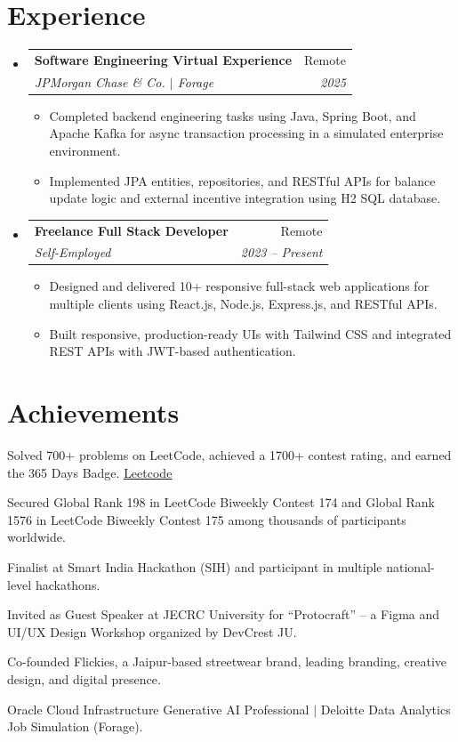 \documentclass[letterpaper,11pt]{article}
\makeatletter
\newcommand{\resumeItem}[1]{
  \item\small{
    {#1 \vspace{-2pt}}
  }
}
\newcommand{\resumeSubheading}[4]{
  \vspace{-2pt}\item
    \begin{tabular*}{0.97\textwidth}[t]{l@{\extracolsep{\fill}}r}
      \textbf{#1} & #2 \\
      \textit{\small#3} & \textit{\small #4} \\
    \end{tabular*}\vspace{-7pt}
}
\newcommand{\resumeSubHeadingListStart}{\begin{itemize}[leftmargin=0.15in, label={}]}
\newcommand{\resumeSubHeadingListEnd}{\end{itemize}}
\newcommand{\resumeItemListStart}{\begin{itemize}[label=$\vcenter{\hbox{\tiny$\bullet$}}$]}
\newcommand{\resumeItemListEnd}{\end{itemize}\vspace{-5pt}}
\makeatother
\begin{document}
\section{Experience}
\resumeSubHeadingListStart

\resumeSubheading
  {Software Engineering Virtual Experience}{Remote}
  {JPMorgan Chase \& Co. $|$ Forage}{2025}
  \resumeItemListStart
\resumeItem{Completed backend engineering tasks using Java, Spring Boot, and Apache Kafka for async transaction processing in a simulated enterprise environment.}
\resumeItem{Implemented JPA entities, repositories, and RESTful APIs for balance update logic and external incentive integration using H2 SQL database.}
  \resumeItemListEnd

\resumeSubheading
  {Freelance Full Stack Developer}{Remote}
  {Self-Employed}{2023 -- Present}
  \resumeItemListStart
    \resumeItem{Designed and delivered 10+ responsive full-stack web applications for multiple clients using React.js, Node.js, Express.js, and RESTful APIs.}
    \resumeItem{Built responsive, production-ready UIs with Tailwind CSS and integrated REST APIs with JWT-based authentication.}
  \resumeItemListEnd

\resumeSubHeadingListEnd


\section{Achievements}
\vspace{-2pt}
\begin{itemize}[leftmargin=0.15in, label=$\vcenter{\hbox{\tiny$\bullet$}}$, itemsep=-3pt, topsep=0pt]
  \small{
 \item{Solved 700+ problems on LeetCode, achieved a 1700+ contest rating, and earned the 365 Days Badge. \hfill \href{https://leetcode.com/u/mannsvijay/}{\underline{Leetcode}}}
  
  \item{Secured Global Rank 198 in LeetCode Biweekly Contest 174 and Global Rank 1576 in LeetCode Biweekly Contest 175 among thousands of participants worldwide.}
  
  \item{Finalist at Smart India Hackathon (SIH) and participant in multiple national-level hackathons.}
  
  \item{Invited as Guest Speaker at JECRC University for ``Protocraft'' -- a Figma and UI/UX Design Workshop organized by DevCrest JU.}
  
  \item{Co-founded Flickies, a Jaipur-based streetwear brand, leading branding, creative design, and digital presence.}
  
  \item{Oracle Cloud Infrastructure Generative AI Professional $|$  Deloitte Data Analytics Job Simulation (Forage).}
  }
\end{itemize}

\end{document}
